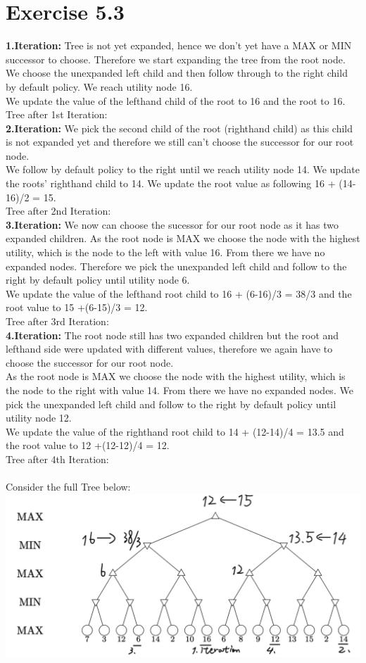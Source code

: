 \documentclass[12pt]{article}
\begin{document}
\section*{Exercise 5.3}
\textbf{1.Iteration:} Tree is not yet expanded, hence we don't yet have a MAX or MIN successor to choose. Therefore we start expanding the tree from the root node. \\
We choose the unexpanded left child and then follow through to the right child by default policy. We reach utility node 16.\\
We update the value of the lefthand child of the root to 16 and the root to 16.\\
Tree after 1st Iteration:\\
\textbf{2.Iteration:} We pick the second child of the root (righthand child) as this child is not expanded yet and therefore we still can't choose the successor for our root node. \\ 
We follow by default policy to the right until we reach utility node 14. We update the roots' righthand child to 14. We update the root value as following 16 + (14-16)/2 = 15.\\
Tree after 2nd Iteration:\\
\textbf{3.Iteration:} We now can choose the sucessor for our root node as it has two expanded children. As the root node is MAX we choose the node with the highest utility, which is the node to the left with value 16. From there we have no expanded nodes. Therefore we pick the unexpanded left child and follow to the right by default policy until utility node 6.\\
We update the value of the lefthand root child to 16 + (6-16)/3 = 38/3 and the root value to 15 +(6-15)/3 = 12.\\
Tree after 3rd Iteration:\\
\textbf{4.Iteration:} The root node still has two expanded children but the root and lefthand side were updated with different values, therefore we again have to choose the successor for our root node.\\
As the root node is MAX we choose the node with the highest utility, which is the node to the right with value 14. From there we have no expanded nodes. We pick the unexpanded left child and follow to the right by default policy until utility node 12.\\
We update the value of the righthand root child to 14 + (12-14)/4 = 13.5 and the root value to 12 +(12-12)/4 = 12.\\
Tree after 4th Iteration:\\ \\
Consider the full Tree below: \\
\includegraphics[width=\textwidth]{figures/5.3.png}\\
\end{document}
